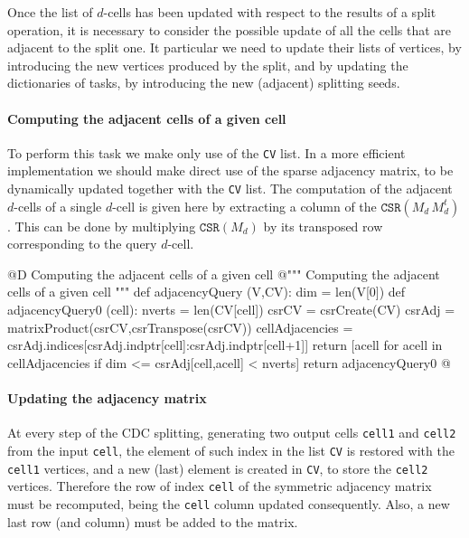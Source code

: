 \documentclass[11pt,oneside]{article}	%
\begin{document}
Once the list of $d$-cells has been updated with respect to the results of a split operation, it is necessary to consider the possible update of all the cells that are adjacent to the split one.  It particular we need to update their lists of vertices, by introducing the new vertices produced by the split, and by updating the dictionaries of tasks, by introducing the new (adjacent) splitting seeds.

\paragraph{Computing the adjacent cells of a given cell}
To perform this task we make only use of the \texttt{CV} list. In a more efficient implementation we should make direct use of the sparse adjacency matrix, to be dynamically updated together with the \texttt{CV} list.
The computation of the adjacent $d$-cells of a single $d$-cell is given here by extracting a column of the $\texttt{CSR}(M_d\, M_d^t)$. This can be done by multiplying $\texttt{CSR}(M_d)$ by its transposed row corresponding to the query $d$-cell. 

@D Computing the adjacent cells of a given cell
@{""" Computing the adjacent cells of a given cell """
def adjacencyQuery (V,CV):
	dim = len(V[0])
	def adjacencyQuery0 (cell):
		nverts = len(CV[cell])
		csrCV =  csrCreate(CV)
		csrAdj = matrixProduct(csrCV,csrTranspose(csrCV))
		cellAdjacencies = csrAdj.indices[csrAdj.indptr[cell]:csrAdj.indptr[cell+1]]
		return [acell for acell in cellAdjacencies if dim <= csrAdj[cell,acell] < nverts]
	return adjacencyQuery0
@}

\paragraph{Updating the adjacency matrix}
At every step of the CDC splitting, generating two output cells \texttt{cell1} and  \texttt{cell2} from the input  \texttt{cell}, the element of such index in the list \texttt{CV} is restored with the \texttt{cell1} vertices, and a new (last) element is created in \texttt{CV}, to store the \texttt{cell2} vertices.
Therefore the row of index \texttt{cell} of the symmetric  adjacency matrix must be recomputed, being the \texttt{cell} column updated consequently. Also, a new last row (and column) must be added to the matrix. 
\end{document}
